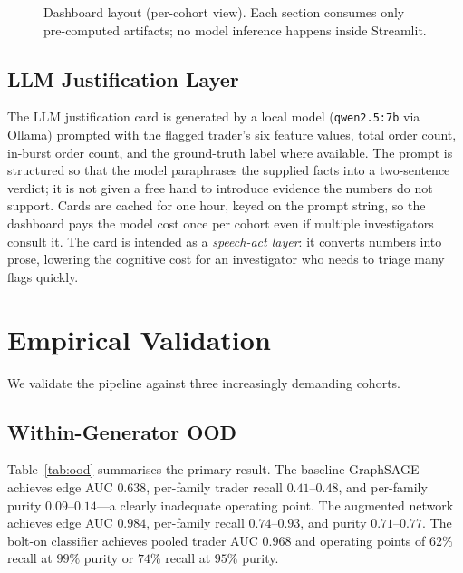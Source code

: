 \documentclass[10pt,twocolumn,letterpaper]{article}
\begin{document}
\begin{figure}[t]
\small
\noindent{}
\caption{Dashboard layout (per-cohort view). Each section consumes only
pre-computed artifacts; no model inference happens inside Streamlit.}
\label{fig:dash}
\end{figure}

\subsection{LLM Justification Layer}
\label{sec:llm}
The LLM justification card is generated by a local model
(\texttt{qwen2.5:7b} via Ollama) prompted with the flagged trader's
six feature values, total order count, in-burst order count, and the
ground-truth label where available. The prompt is structured so that
the model paraphrases the supplied facts into a two-sentence verdict;
it is not given a free hand to introduce evidence the numbers do not
support. Cards are cached for one hour, keyed on the prompt string,
so the dashboard pays the model cost once per cohort even if multiple
investigators consult it. The card is intended as a \emph{speech-act
layer}: it converts numbers into prose, lowering the cognitive cost
for an investigator who needs to triage many flags quickly.

\section{Empirical Validation}
\label{sec:results}

We validate the pipeline against three increasingly demanding cohorts.

\subsection{Within-Generator OOD}
Table~\ref{tab:ood} summarises the primary result. The baseline
GraphSAGE achieves edge AUC \(0.638\), per-family trader recall
\(0.41\)--\(0.48\), and per-family purity \(0.09\)--\(0.14\)---a
clearly inadequate operating point. The augmented network achieves
edge AUC \(0.984\), per-family recall \(0.74\)--\(0.93\), and purity
\(0.71\)--\(0.77\). The bolt-on classifier achieves pooled trader AUC
\(0.968\) and operating points of \(62\%\) recall at \(99\%\) purity
or \(74\%\) recall at \(95\%\) purity.
\end{document}
